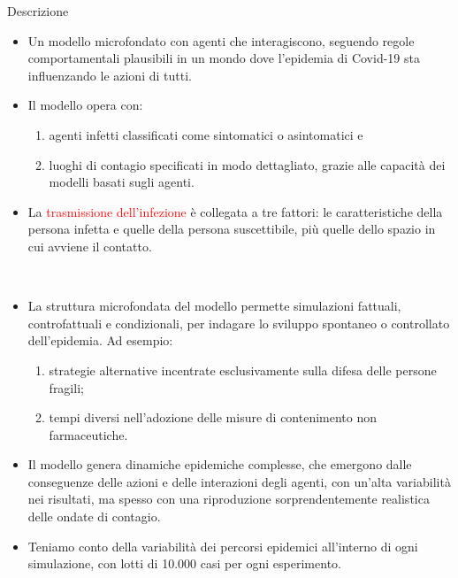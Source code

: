 \documentclass[]{beamer}
\begin{document}
\begin{frame}{Descrizione}

\begin{itemize}

\item
Un modello microfondato con agenti che interagiscono, seguendo regole comportamentali plausibili in un mondo dove l'epidemia di Covid-19 sta influenzando le azioni di tutti.
\item
Il modello opera con:

\begin{enumerate}[i]
\item agenti infetti classificati come sintomatici o asintomatici e
\item luoghi di contagio specificati in modo dettagliato, grazie alle capacit\`{a} dei modelli basati sugli agenti.
\end{enumerate}

 \item La \textcolor{red}{trasmissione dell'infezione} \`{e} collegata a tre fattori: le caratteristiche della persona infetta e quelle della persona suscettibile, pi\`{u} quelle dello spazio in cui avviene il contatto.

\end{itemize}
\end{frame}

\begin{frame}{~}

\begin{itemize}
\item
La struttura microfondata del modello permette simulazioni fattuali, controfattuali e condizionali, per indagare lo sviluppo spontaneo o controllato dell'epidemia. Ad esempio:

\begin{enumerate}[i]
\item  strategie alternative incentrate esclusivamente sulla difesa delle persone fragili;
\item tempi diversi nell'adozione delle misure di contenimento non farmaceutiche.
\end{enumerate}

\item
Il modello genera dinamiche epidemiche complesse, che emergono dalle conseguenze delle azioni e delle interazioni degli agenti, con un'alta variabilit\`{a} nei risultati, ma spesso con una riproduzione sorprendentemente realistica delle ondate di contagio.

\item
Teniamo conto della variabilit\`{a} dei percorsi epidemici all'interno di ogni simulazione, con lotti di 10.000 casi per ogni esperimento.

\end{itemize}
\end{frame}
\end{document}
